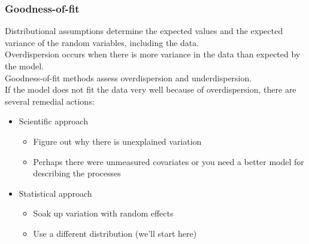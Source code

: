 \documentclass[color=usenames,dvipsnames]{beamer}\usepackage[]{graphicx}\usepackage[]{color}
\begin{document}
\begin{frame}
  \frametitle{Goodness-of-fit}
  \small
  Distributional assumptions determine the expected values
  \alert{and the expected variance} of the random variables, including
  the data. \\  
  \pause
  \vfill
  Overdispersion occurs when there is more variance in the data than
  expected by the model. \\
  \pause
  \vfill
  Goodness-of-fit methods assess overdispersion and underdispersion. \\
  \pause
  \vfill
  If the model does not fit the data very well because of
  overdispersion, there are several remedial actions:
  \begin{itemize}
  \item<5-> Scientific approach
    \begin{itemize}
       \item Figure out why there is unexplained variation
       \item Perhaps there were unmeasured covariates or you need a
         better model for describing the processes
    \end{itemize}
  \item<6-> Statistical approach
    \begin{itemize}
      \item Soak up variation with random effects
      \item Use a different distribution (we'll start here)
    \end{itemize}
  \end{itemize}
\end{frame}
\end{document}
